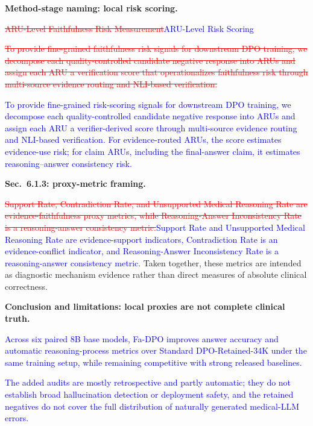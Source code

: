 \documentclass[12pt]{article}
\newcommand{\deleted}[1]{\textcolor{red}{\sout{#1}}}
\newcommand{\added}[1]{\textcolor{blue}{#1}}
\begin{document}
\textbf{Method-stage naming: local risk scoring.}
\begin{displayquote}
\deleted{ARU-Level Faithfulness Risk Measurement}\added{ARU-Level Risk Scoring}

\deleted{To provide fine-grained faithfulness risk signals for downstream DPO training, we decompose each quality-controlled candidate negative response into ARUs and assign each ARU a verification score that operationalizes faithfulness risk through multi-source evidence routing and NLI-based verification.}

\added{To provide fine-grained risk-scoring signals for downstream DPO training, we decompose each quality-controlled candidate negative response into ARUs and assign each ARU a verifier-derived score through multi-source evidence routing and NLI-based verification. For evidence-routed ARUs, the score estimates evidence-use risk; for claim ARUs, including the final-answer claim, it estimates reasoning--answer consistency risk.}
\end{displayquote}

\textbf{Sec.~6.1.3: proxy-metric framing.}
\begin{displayquote}
\deleted{Support Rate, Contradiction Rate, and Unsupported Medical Reasoning Rate are evidence-faithfulness proxy metrics, while Reasoning-Answer Inconsistency Rate is a reasoning-answer consistency metric.}\added{Support Rate and Unsupported Medical Reasoning Rate are evidence-support indicators, Contradiction Rate is an evidence-conflict indicator, and Reasoning-Answer Inconsistency Rate is a reasoning-answer consistency metric.} Taken together, these metrics are intended as diagnostic mechanism evidence rather than direct measures of absolute clinical correctness.
\end{displayquote}

\textbf{Conclusion and limitations: local proxies are not complete clinical truth.}
\begin{displayquote}
\added{Across six paired 8B base models, Fa-DPO improves answer accuracy and automatic reasoning-process metrics over Standard DPO-Retained-34K under the same training setup, while remaining competitive with strong released baselines.}

\added{The added audits are mostly retrospective and partly automatic; they do not establish broad hallucination detection or deployment safety, and the retained negatives do not cover the full distribution of naturally generated medical-LLM errors.}
\end{displayquote}
\end{document}
